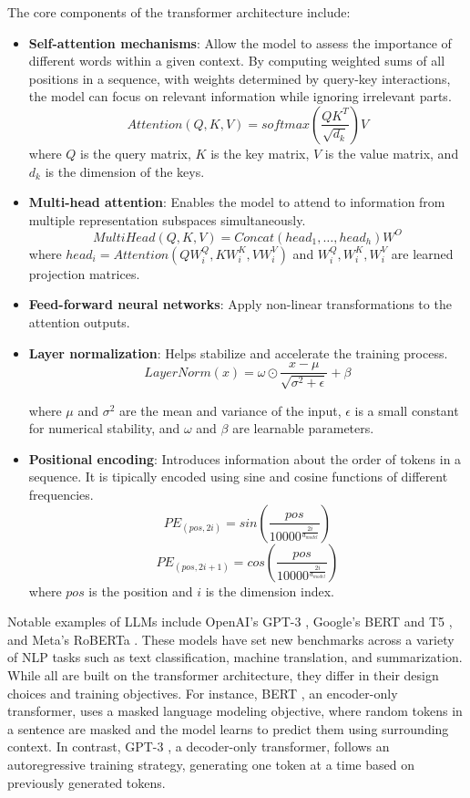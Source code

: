 The core components of the transformer architecture include:
\begin{itemize}
    \item \textbf{Self-attention mechanisms}: Allow the model to assess the importance of different words within a given context. By computing weighted sums of all positions in a sequence, with weights determined by query-key interactions, the model can focus on relevant information while ignoring irrelevant parts.
    $$Attention (Q, K, V) = softmax\left(\frac{QK^T}{\sqrt{d_k}}\right)V$$
    where \( Q \) is the query matrix, \( K \) is the key matrix, \( V \) is the value matrix, and \( d_k \) is the dimension of the keys.

    \item \textbf{Multi-head attention}: Enables the model to attend to information from multiple representation subspaces simultaneously.
    $$MultiHead(Q, K, V) = Concat(head_1, \dots, head_h)W^O$$
    where \( head_i = Attention(QW_i^Q, KW_i^K, VW_i^V) \) and \( W_i^Q, W_i^K, W_i^V \) are learned projection matrices.

    \item \textbf{Feed-forward neural networks}: Apply non-linear transformations to the attention outputs.
    \item \textbf{Layer normalization}: Helps stabilize and accelerate the training process.
    $$LayerNorm(x) = \omega \odot  \frac{x - \mu}{\sqrt{\sigma^2 + \epsilon}} + \beta$$

    where \( \mu \) and \( \sigma^2 \) are the mean and variance of the input, \( \epsilon \) is a small constant for numerical stability, and \( \omega \) and \( \beta \) are learnable parameters.
    

    \item \textbf{Positional encoding}: Introduces information about the order of tokens in a sequence. It is tipically encoded using sine and cosine functions of different frequencies.
    $$PE_{(pos, 2i)} = sin\left(\frac{pos}{10000^{\frac{2i}{d_{model}}}}\right)$$  
    $$PE_{(pos, 2i+1)} = cos\left(\frac{pos}{10000^{\frac{2i}{d_{model}}}}\right)$$
    where \( pos \) is the position and \( i \) is the dimension index.

\end{itemize}

Notable examples of LLMs include OpenAI's GPT-3 \citep{gpt3Paper}, Google's BERT \citep{bertPaper} and T5 \citep{t5GooglePaper}, and Meta's RoBERTa \citep{robertaPaper}. These models have set new benchmarks across a variety of NLP tasks such as text classification, machine translation, and summarization. While all are built on the transformer architecture, they differ in their design choices and training objectives. For instance, BERT \citep{bertPaper}, an encoder-only transformer, uses a masked language modeling objective, where random tokens in a sentence are masked and the model learns to predict them using surrounding context. In contrast, GPT-3 \citep{gpt3Paper}, a decoder-only transformer, follows an autoregressive training strategy, generating one token at a time based on previously generated tokens.

